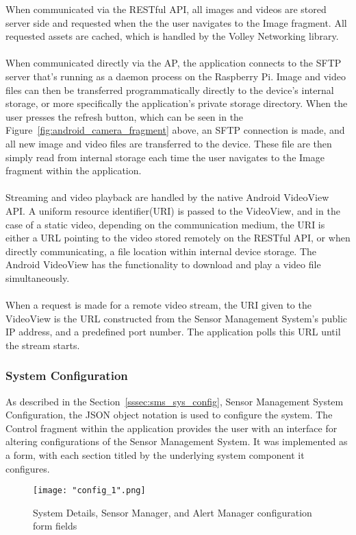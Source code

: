 \documentclass{article}
\begin{document}
\noindent
When communicated via the RESTful API, all images and videos are stored server side and requested when the the user navigates to the Image fragment. All requested assets are cached, which is handled by the Volley Networking library. \\\\
When communicated directly via the AP, the application connects to the SFTP server that's running as a daemon process on the Raspberry Pi. Image and video files can then be transferred programmatically directly to the device’s internal storage, or more specifically the application’s private storage directory. When the user presses the refresh button, which can be seen in the Figure~\ref{fig:android_camera_fragment} above, an SFTP connection is made, and all new image and video files are transferred to the device. These file are then simply read from internal storage each time the user navigates to the Image fragment within the application. \\\\
Streaming and video playback are handled by the native Android VideoView API. A uniform resource identifier(URI) is passed to the VideoView, and in the case of a static video, depending on the communication medium, the URI is either a URL pointing to the video stored remotely on the RESTful API, or when directly communicating, a file location within internal device storage. The Android VideoView has the functionality to download and play a video file simultaneously. \\\\
When a request is made for a remote video stream, the URI given to the VideoView is the URL constructed from the Sensor Management System\rq s public IP address, and a predefined port number. The application polls this URL until the stream starts. 

\newpage
\subsubsection{System Configuration}
As described in the Section~\ref{sssec:sms_sys_config}, Sensor Management System Configuration, the JSON object notation is used to configure the system. The Control fragment within the application provides the user with an interface for altering configurations of the Sensor Management System. It was implemented as a form, with each section titled by the underlying system component it configures. 

\begin{figure}[H]
\centering
\texttt{[image: "config\_1".png]}
\caption{System Details, Sensor Manager, and Alert Manager configuration form fields}
\label{fig:android_config_1}
\end{figure}
\end{document}
